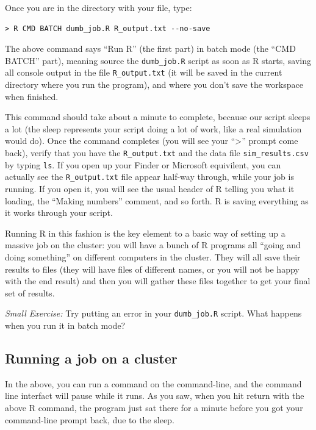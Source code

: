 \documentclass[
]{book}
\begin{document}
Once you are in the directory with your file, type:

\begin{verbatim}
> R CMD BATCH dumb_job.R R_output.txt --no-save
\end{verbatim}

The above command says ``Run R'' (the first part) in batch mode (the ``CMD BATCH'' part), meaning source the \texttt{dumb\_job.R} script as soon as R starts, saving all console output in the file \texttt{R\_output.txt} (it will be saved in the current directory where you run the program), and where you don't save the workspace when finished.

This command should take about a minute to complete, because our script sleeps a lot (the sleep represents your script doing a lot of work, like a real simulation would do).
Once the command completes (you will see your ``\textgreater{}'' prompt come back), verify that you have the \texttt{R\_output.txt} and the data file \texttt{sim\_results.csv} by typing \texttt{ls}.
If you open up your Finder or Microsoft equivilent, you can actually see the \texttt{R\_output.txt} file appear half-way through, while your job is running.
If you open it, you will see the usual header of R telling you what it loading, the ``Making numbers'' comment, and so forth.
R is saving everything as it works through your script.

Running R in this fashion is the key element to a basic way of setting up a massive job on the cluster: you will have a bunch of R programs all ``going and doing something'' on different computers in the cluster.
They will all save their results to files (they will have files of different names, or you will not be happy with the end result) and then you will gather these files together to get your final set of results.

\emph{Small Exercise:} Try putting an error in your \texttt{dumb\_job.R} script. What happens when you run it in batch mode?

\subsection{Running a job on a cluster}\label{running-a-job-on-a-cluster}

In the above, you can run a command on the command-line, and the command line interfact will pause while it runs.
As you saw, when you hit return with the above R command, the program just sat there for a minute before you got your command-line prompt back, due to the sleep.
\end{document}
